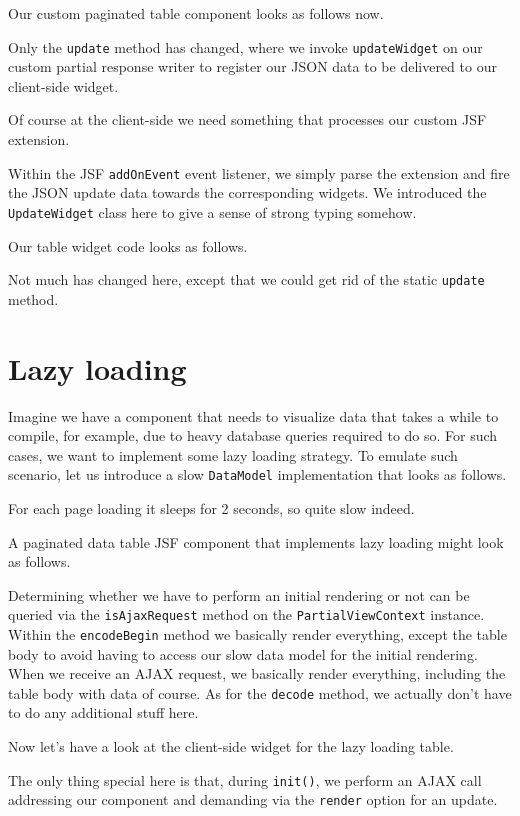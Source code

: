 Our custom paginated table component looks as follows now.

Only the \texttt{update} method has changed, where we invoke \texttt{updateWidget} on our custom partial response writer to register our JSON data to be delivered to our client-side widget.

Of course at the client-side we need something that processes our custom JSF extension.

Within the JSF \texttt{addOnEvent} event listener, we simply parse the extension and fire the JSON update data towards the corresponding widgets.
We introduced the \texttt{UpdateWidget} class here to give a sense of strong typing somehow.

Our table widget code looks as follows.

Not much has changed here, except that we could get rid of the static \texttt{update} method.

\section{Lazy loading}
Imagine we have a component that needs to visualize data that takes a while to compile, for example, due to heavy database queries required to do so.
For such cases, we want to implement some lazy loading strategy.
To emulate such scenario, let us introduce a slow \texttt{DataModel} implementation that looks as follows.

For each page loading it sleeps for 2 seconds, so quite slow indeed.

A paginated data table JSF component that implements lazy loading might look as follows.

Determining whether we have to perform an initial rendering or not can be queried via the \texttt{isAjaxRequest} method on the \texttt{PartialViewContext} instance.
Within the \texttt{encodeBegin} method we basically render everything, except the table body to avoid having to access our slow data model for the initial rendering.
When we receive an AJAX request, we basically render everything, including the table body with data of course.
As for the \texttt{decode} method, we actually don't have to do any additional stuff here.

Now let's have a look at the client-side widget for the lazy loading table.

The only thing special here is that, during \texttt{init()}, we perform an AJAX call addressing our component and demanding via the \texttt{render} option for an update.

